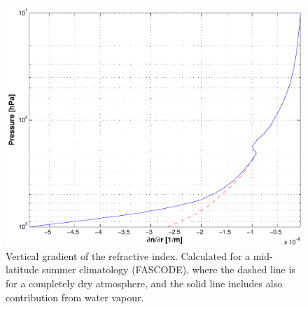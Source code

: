 \label{sec:ppath:refr2D}
\begin{figure}[!t]
 \begin{center}
  \includegraphics*[width=0.85\hsize]{Figs/ppath/ppath_dndr}
  \caption{Vertical gradient of the refractive index.
     Calculated for a mid-latitude summer climatology (FASCODE), where
     the dashed line is for a completely dry atmosphere, and the solid line
     includes also contribution from water vapour.}
  \label{fig:ppath:dndr}  
 \end{center}
\end{figure}

